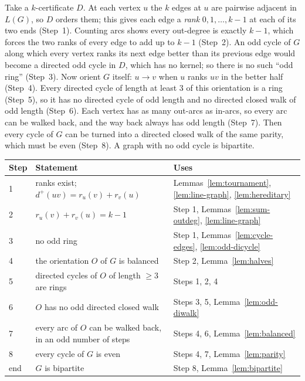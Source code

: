 \documentclass[11pt]{article}
\theoremstyle{plain}
\theoremstyle{definition}
\theoremstyle{remark}
\newcommand{\LG}{L(G)}
\newcommand{\dout}{d^{+}}
\begin{document}
Take a $k$-certificate $D$. At each vertex $u$ the $k$ edges at $u$ are pairwise adjacent in
$\LG$, so $D$ orders them; this gives each edge a \emph{rank} $0,1,\dots,k-1$ at each of its two
ends (Step~1). Counting arcs shows every out-degree is exactly $k-1$, which forces the two ranks
of every edge to add up to $k-1$ (Step~2). An odd cycle of $G$ along which every vertex ranks
its next edge better than its previous edge would become a directed odd cycle in $D$, which has
no kernel; so there is no such ``odd ring'' (Step~3). Now orient $G$ itself: $u\to v$ when $u$
ranks $uv$ in the better half (Step~4). Every directed cycle of length at least $3$ of this
orientation is a ring (Step~5), so it has no directed cycle of odd length and no directed closed
walk of odd length (Step~6). Each vertex has as many out-arcs as in-arcs, so every arc can be
walked back, and the way back always has odd length (Step~7). Then every cycle of $G$ can be
turned into a directed closed walk of the same parity, which must be even (Step~8). A graph with
no odd cycle is bipartite.

\begin{center}
\small
\begin{tabular}{@{}lll@{}}
\toprule
Step & Statement & Uses \\
\midrule
1 & ranks exist; $\dout(uv)=r_u(v)+r_v(u)$ & Lemmas~\ref{lem:tournament}, \ref{lem:line-graph}, \ref{lem:hereditary} \\
2 & $r_u(v)+r_v(u)=k-1$ & Step 1, Lemmas~\ref{lem:sum-outdeg}, \ref{lem:line-graph} \\
3 & no odd ring & Step 1, Lemmas~\ref{lem:cycle-edges}, \ref{lem:odd-dicycle} \\
4 & the orientation $O$ of $G$ is balanced & Step 2, Lemma~\ref{lem:halves} \\
5 & directed cycles of $O$ of length $\ge 3$ are rings & Steps 1, 2, 4 \\
6 & $O$ has no odd directed closed walk & Steps 3, 5, Lemma~\ref{lem:odd-diwalk} \\
7 & every arc of $O$ can be walked back, in an odd number of steps & Steps 4, 6, Lemma~\ref{lem:balanced} \\
8 & every cycle of $G$ is even & Steps 4, 7, Lemma~\ref{lem:parity} \\
end & $G$ is bipartite & Step 8, Lemma~\ref{lem:bipartite} \\
\bottomrule
\end{tabular}
\end{center}
\end{document}

